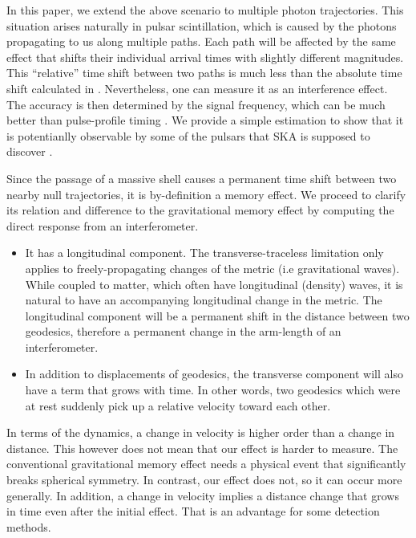 \documentclass[aps,showpacs,onecolumn,floats,prd,superscriptaddress,nofootinbib]{revtex4-1}
\begin{document}
In this paper, we extend the above scenario to multiple photon trajectories.
This situation arises naturally in pulsar scintillation, which is caused by the photons propagating to us along multiple paths. 
Each path will be affected by the same effect that shifts their individual arrival times with slightly different magnitudes.
This ``relative'' time shift between two paths is much less than the absolute time shift calculated in \cite{Olum:2013gza, PhysRevD.93.103006}. 
Nevertheless, one can measure it as an interference effect.
The accuracy is then determined by the signal frequency, which can be much better than pulse-profile timing \cite{PenYan14}.
We provide a simple estimation to show that it is potentianlly observable by some of the pulsars that SKA is supposed to discover \cite{MSPpopulation}. 

Since the passage of a massive shell causes a permanent time shift between two nearby null trajectories, it is by-definition a memory effect.
We proceed to clarify its relation and difference to the gravitational memory effect \cite{Christodoulou_effect,GW_memory} by computing the direct response from an interferometer.


\begin{itemize}
\item It has a longitudinal component. The transverse-traceless limitation only applies to freely-propagating changes of the metric (i.e gravitational waves). 
While coupled to matter, which often have longitudinal (density) waves, it is natural to have an accompanying longitudinal change in the metric. 
The longitudinal component will be a permanent shift in the distance between two geodesics, therefore a permanent change in the arm-length of an interferometer.
\item In addition to displacements of geodesics, the transverse component will also have a term that grows with time. 
In other words, two geodesics which were at rest suddenly pick up a relative velocity toward each other.
\end{itemize}
In terms of the dynamics, a change in velocity is higher order than a change in distance.
This however does not mean that our effect is harder to measure. 
The conventional gravitational memory effect needs a physical event that significantly breaks spherical symmetry.  
In contrast, our effect does not, so it can occur more generally. 
In addition, a change in velocity implies a distance change that grows in time even after the initial effect. 
That is an advantage for some detection methods.  
\end{document}
